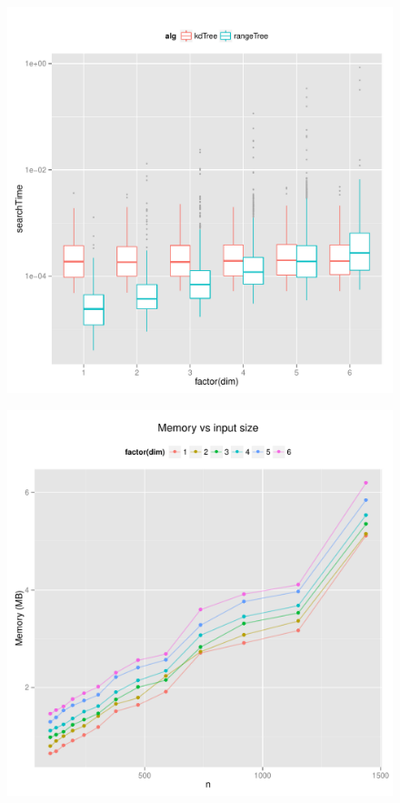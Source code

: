 \documentclass{article}
\begin{document}
%
%
%  
\begin{figure}[H]
    \centering
    \includegraphics[width=\textwidth]{../src/R/plots/boxplot.pdf}
\end{figure}
\begin{figure}[H]
    \centering
    \includegraphics[width=\textwidth]{../src/R/plots/kdmem.pdf}
\end{figure}
\end{document}
